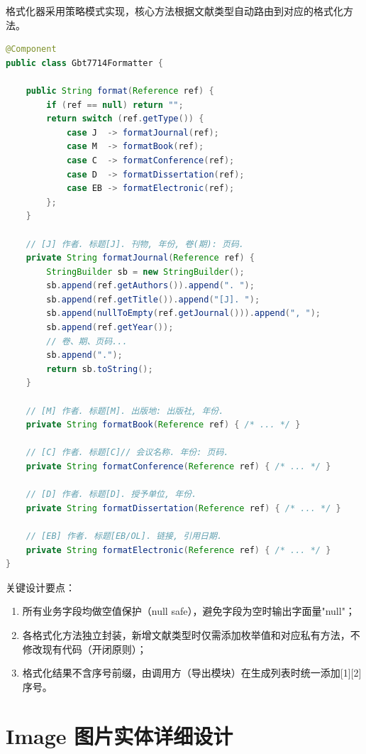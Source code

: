 \documentclass{../../softeng}
\begin{document}
格式化器采用策略模式实现，核心方法根据文献类型自动路由到对应的格式化方法。

\begin{lstlisting}[language=Java,caption={Gbt7714Formatter 核心算法}]
@Component
public class Gbt7714Formatter {

    public String format(Reference ref) {
        if (ref == null) return "";
        return switch (ref.getType()) {
            case J  -> formatJournal(ref);
            case M  -> formatBook(ref);
            case C  -> formatConference(ref);
            case D  -> formatDissertation(ref);
            case EB -> formatElectronic(ref);
        };
    }

    // [J] 作者. 标题[J]. 刊物, 年份, 卷(期): 页码.
    private String formatJournal(Reference ref) {
        StringBuilder sb = new StringBuilder();
        sb.append(ref.getAuthors()).append(". ");
        sb.append(ref.getTitle()).append("[J]. ");
        sb.append(nullToEmpty(ref.getJournal())).append(", ");
        sb.append(ref.getYear());
        // 卷、期、页码...
        sb.append(".");
        return sb.toString();
    }

    // [M] 作者. 标题[M]. 出版地: 出版社, 年份.
    private String formatBook(Reference ref) { /* ... */ }

    // [C] 作者. 标题[C]// 会议名称. 年份: 页码.
    private String formatConference(Reference ref) { /* ... */ }

    // [D] 作者. 标题[D]. 授予单位, 年份.
    private String formatDissertation(Reference ref) { /* ... */ }

    // [EB] 作者. 标题[EB/OL]. 链接, 引用日期.
    private String formatElectronic(Reference ref) { /* ... */ }
}
\end{lstlisting}

关键设计要点：
\begin{enumerate}
    \item 所有业务字段均做空值保护（null safe），避免字段为空时输出字面量"null"；
    \item 各格式化方法独立封装，新增文献类型时仅需添加枚举值和对应私有方法，不修改现有代码（开闭原则）；
    \item 格式化结果不含序号前缀，由调用方（导出模块）在生成列表时统一添加[1][2]序号。
\end{enumerate}

\section{Image 图片实体详细设计}
\end{document}
